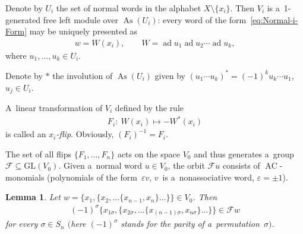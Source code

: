 \documentclass[11pt]{article}
\newtheorem{lemma}{Lemma}
\DeclareMathOperator{\ad}{ad}
\begin{document}
Denote by $U_i$ the set of normal words in the alphabet $X\setminus \{x_i\} $.
Then $V_i$ is a~1-generated free left module over $\operatorname{As}(U_i)$: every word of the form~\eqref{eq:Normal-i-Form} may be
uniquely presented as
\begin{gather*}
w = W(x_i),
\qquad
W=\ad u_1 \ad u_2 \cdots \ad u_k,
\end{gather*}
where $u_1,\dots, u_k \in U_i$.

Denote by $*$ the involution of $\operatorname{As}(U_i)$ given by $(u_1\cdots u_k)^* = (-1)^{k}u_k\cdots u_1$, $u_j\in U_i$.

\begin{definition}
\label{defn:x_i-flip}
A~linear transformation of $V_i$ def\/ined by the rule
\begin{gather*}
F_i: \ W(x_i) \mapsto -W^*(x_i)
\end{gather*}
is called an {\em $x_i$-flip}.
Obviously, $(F_i)^{-1}=F_i$.
\end{definition}

The set of all f\/lips $\{F_1,\dots, F_n\}$ acts on the space $V_0$ and thus generates a~group $\mathcal F\subseteq
\mathrm{GL}(V_0)$.
Given a~normal word $u\in V_0$, the orbit $\mathcal Fu$ consists of $\operatorname{AC}$-monomials (polynomials of the form~$\varepsilon v$, $v$~is a~nonassociative word, $\varepsilon =\pm 1$).

\begin{lemma}
\label{lem:FlipsGenerateS_n}
Let $w = \{x_1,\{x_2, \dots \{x_{n-1},x_n\}\dots \}\}\in V_0$.
Then
\begin{gather*}
(-1)^\sigma \{x_{1\sigma},\{x_{2\sigma}, \dots \{x_{(n-1)\sigma},x_{n\sigma}\}\dots \}\}\in \mathcal Fw
\end{gather*}
for every $\sigma \in S_n$ $($here $(-1)^\sigma $ stands for the parity of a~permutation~$\sigma)$.
\end{lemma}
\end{document}
